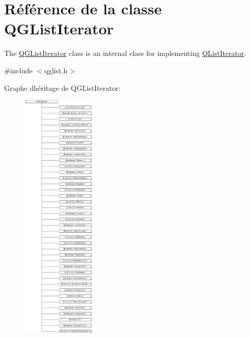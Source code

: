 \hypertarget{class_q_g_list_iterator}{}\section{Référence de la classe Q\+G\+List\+Iterator}
\label{class_q_g_list_iterator}


The \hyperlink{class_q_g_list_iterator}{Q\+G\+List\+Iterator} class is an internal class for implementing \hyperlink{class_q_list_iterator}{Q\+List\+Iterator}.  




{\ttfamily \#include $<$qglist.\+h$>$}

Graphe d\textquotesingle{}héritage de Q\+G\+List\+Iterator\+:\begin{figure}[H]
\begin{center}
\leavevmode
\includegraphics[height=12.000000cm]{class_q_g_list_iterator}
\end{center}
\end{figure}
